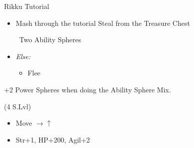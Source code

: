 \begin{battle}{Rikku Tutorial}
    \begin{itemize}
        \item Mash through the tutorial
        \rikkuf Steal from the Treasure Chest
        \begin{itemize}
            \rikkuf \od\ Two Ability Spheres
        \end{itemize}
        \item \textit{Else:}
        \begin{itemize}
            \rikkuf \od\ Two Potions or Hi-Potions
            \rikkuf Defend
            \item Flee
        \end{itemize}
    \end{itemize}
    +2 Power Spheres when doing the Ability Sphere Mix.
\end{battle}
\begin{spheregrid}
    \begin{itemize}
        \tidusf (4 S.Lvl)
        \begin{itemize}
            \item Move $\rightarrow\uparrow$
            \item Str+1, HP+200, Agil+2
        \end{itemize}
    \end{itemize}
\end{spheregrid}
